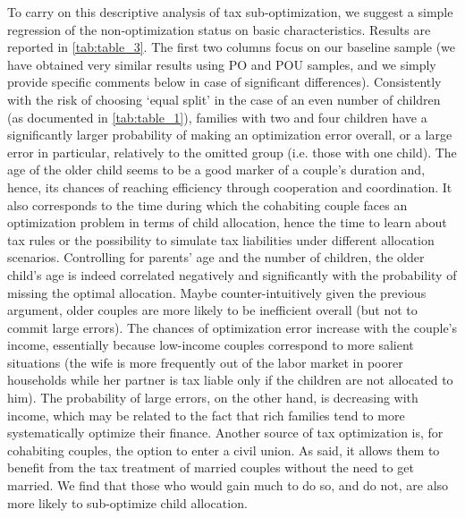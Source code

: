 To carry on this descriptive analysis of tax sub-optimization, we suggest a simple regression of the non-optimization status on basic characteristics. Results are reported in \autoref{tab:table_3}. The first two columns focus on our baseline sample (we have obtained very similar results using PO and POU samples, and we simply provide specific comments below in case of significant differences). Consistently with the risk of choosing `equal split’ in the case of an even number of children (as documented in \autoref{tab:table_1}), families with two and four children have a significantly larger probability of making an optimization error overall, or a large error in particular, relatively to the omitted group (i.e. those with one child). The age of the older child seems to be a good marker of a couple’s duration and, hence, its chances of reaching efficiency through cooperation and coordination. It also corresponds to the time during which the cohabiting couple faces an optimization problem in terms of child allocation, hence the time to learn about tax rules or the possibility to simulate tax liabilities under different allocation scenarios. Controlling for parents’ age and the number of children, the older child’s age is indeed correlated negatively and significantly with the probability of missing the optimal allocation. Maybe counter-intuitively given the previous argument, older couples are more likely to be inefficient overall (but not to commit large errors). The chances of optimization error increase with the couple’s income, essentially because low-income couples correspond to more salient situations (the wife is more frequently out of the labor market in poorer households while her partner is tax liable only if the children are not allocated to him). The probability of large errors, on the other hand, is decreasing with income, which may be related to the fact that rich families tend to more systematically optimize their finance. Another source of tax optimization is, for cohabiting couples, the option to enter a civil union. As said, it allows them to benefit from the tax treatment of married couples without the need to get married. We find that those who would gain much to do so, and do not, are also more likely to sub-optimize child allocation.


